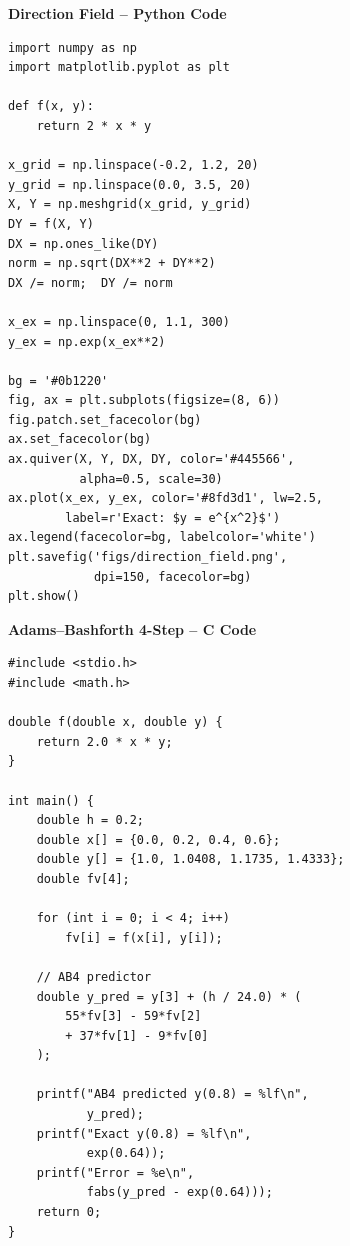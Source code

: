 \documentclass[12pt]{beamer}
\begin{document}
\begin{frame}{\textbf{Direction Field -- Python Code}}
\begin{lstlisting}
import numpy as np
import matplotlib.pyplot as plt

def f(x, y):
    return 2 * x * y

x_grid = np.linspace(-0.2, 1.2, 20)
y_grid = np.linspace(0.0, 3.5, 20)
X, Y = np.meshgrid(x_grid, y_grid)
DY = f(X, Y)
DX = np.ones_like(DY)
norm = np.sqrt(DX**2 + DY**2)
DX /= norm;  DY /= norm

x_ex = np.linspace(0, 1.1, 300)
y_ex = np.exp(x_ex**2)

bg = '#0b1220'
fig, ax = plt.subplots(figsize=(8, 6))
fig.patch.set_facecolor(bg)
ax.set_facecolor(bg)
ax.quiver(X, Y, DX, DY, color='#445566',
          alpha=0.5, scale=30)
ax.plot(x_ex, y_ex, color='#8fd3d1', lw=2.5,
        label=r'Exact: $y = e^{x^2}$')
ax.legend(facecolor=bg, labelcolor='white')
plt.savefig('figs/direction_field.png',
            dpi=150, facecolor=bg)
plt.show()
\end{lstlisting}
\end{frame}

\begin{frame}{\textbf{Adams--Bashforth 4-Step -- C Code}}
\begin{lstlisting}
#include <stdio.h>
#include <math.h>

double f(double x, double y) {
    return 2.0 * x * y;
}

int main() {
    double h = 0.2;
    double x[] = {0.0, 0.2, 0.4, 0.6};
    double y[] = {1.0, 1.0408, 1.1735, 1.4333};
    double fv[4];

    for (int i = 0; i < 4; i++)
        fv[i] = f(x[i], y[i]);

    // AB4 predictor
    double y_pred = y[3] + (h / 24.0) * (
        55*fv[3] - 59*fv[2]
        + 37*fv[1] - 9*fv[0]
    );

    printf("AB4 predicted y(0.8) = %lf\n",
           y_pred);
    printf("Exact y(0.8) = %lf\n",
           exp(0.64));
    printf("Error = %e\n",
           fabs(y_pred - exp(0.64)));
    return 0;
}
\end{lstlisting}
\end{frame}
\end{document}

